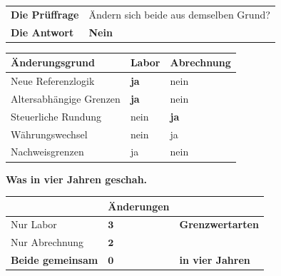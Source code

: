 \begin{merksatz}
\begin{center}
\renewcommand{\arraystretch}{1.55}
\begin{tabular}{@{}P{2.6cm}P{6.2cm}@{}}
\toprule
\textbf{Die Prüffrage} & Ändern sich beide aus demselben Grund?\\
\textbf{Die Antwort} & \textbf{Nein}\\
\bottomrule
\end{tabular}
\end{center}

\begin{center}
{\small
\renewcommand{\arraystretch}{1.45}
\begin{tabular}{@{}P{3.0cm}P{2.4cm}P{2.4cm}@{}}
\toprule
\textbf{Änderungsgrund} & \textbf{Labor} & \textbf{Abrechnung}\\
\midrule
Neue Referenzlogik & \textcolor{gruen}{\textbf{ja}} & \textcolor{akzent}{nein}\\
Altersabhängige Grenzen & \textcolor{gruen}{\textbf{ja}} & \textcolor{akzent}{nein}\\
Steuerliche Rundung & \textcolor{akzent}{nein} & \textcolor{gruen}{\textbf{ja}}\\
Währungswechsel & \textcolor{akzent}{nein} & \textcolor{gruen}{ja}\\
Nachweisgrenzen & \textcolor{gruen}{ja} & \textcolor{akzent}{nein}\\
\bottomrule
\end{tabular}}
\end{center}

\begin{center}
\begin{minipage}{0.88\textwidth}
\end{minipage}
\end{center}

\textbf{Was in vier Jahren geschah.}

\begin{center}
\renewcommand{\arraystretch}{1.45}
\begin{tabular}{@{}P{3.0cm}P{2.4cm}P{2.2cm}@{}}
\toprule
& \textbf{Änderungen} & \\
\midrule
Nur Labor & $\mathbf{3}$ & \textbf{Grenzwert\-arten}\\
Nur Abrechnung & $\mathbf{2}$ & \\
\textbf{Beide gemeinsam} & $\mathbf{0}$ & \textcolor{gruen}{\textbf{in vier Jahren}}\\
\bottomrule
\end{tabular}
\end{center}

\begin{center}
\end{center}
\end{merksatz}

